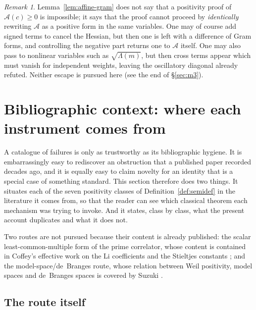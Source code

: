 \documentclass[11pt]{amsart}
\theoremstyle{definition}
\theoremstyle{remark}
\newtheorem{remark}[theorem]{Remark}
\theoremstyle{definition}
\begin{document}
\begin{remark}\label{rmk:affine-scope}
Lemma~\ref{lem:affine-gram} does not say that a positivity proof of $\mathcal A(c)\ge0$ is
impossible; it says that the proof cannot proceed by \emph{identically} rewriting $\mathcal A$ as
a positive form in the same variables. One may of course add signed terms to cancel the Hessian,
but then one is left with a difference of Gram forms, and controlling the negative part returns
one to $\mathcal A$ itself. One may also pass to nonlinear variables such as
$\sqrt{\Lambda(m)}$, but then cross terms appear which must vanish for independent weights,
leaving the oscillatory diagonal already refuted. Neither escape is pursued here (see the end of
\S\ref{sec:m3}).
\end{remark}

\section{Bibliographic context: where each instrument comes from}\label{sec:biblio}

A catalogue of failures is only as trustworthy as its bibliographic hygiene. It is embarrassingly
easy to rediscover an obstruction that a published paper recorded decades ago, and
it is equally easy to claim novelty for an identity that is a special case of something standard. This
section therefore does two things. It situates each of the seven positivity classes of
Definition~\ref{def:semidef} in the literature it comes from, so that the reader can see which
classical theorem each mechanism was trying to invoke. And it states, class by class, what the
present account duplicates and what it does not.

Two routes are not pursued because their content is already published: the scalar
least-common-multiple form of the prime correlator, whose content is contained in Coffey's
effective work on the Li coefficients and the Stieltjes constants \cite{Coffey2005,Coffey2008};
and the model-space/de~Branges route, whose relation between Weil positivity, model spaces and
de~Branges spaces \cite{deBranges} is covered by Suzuki \cite{Suzuki2025}.

\subsection{The route itself}
\end{document}
